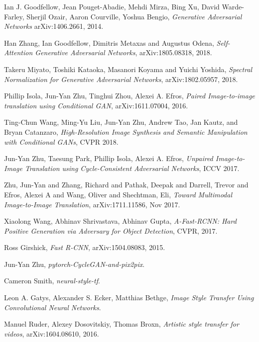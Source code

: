 \begin{thebibliography}{}

    Ian J. Goodfellow, Jean Pouget-Abadie, Mehdi Mirza, Bing Xu, David Warde-Farley, Sherjil Ozair, Aaron Courville, Yoshua Bengio,
    \emph{Generative Adversarial Networks}
    arXiv:1406.2661, 2014.

	Han Zhang, Ian Goodfellow, Dimitris Metaxas and Augustus Odena,
	\emph{Self-Attention Generative Adversarial Networks},
	arXiv:1805.08318, 2018.

	Takeru Miyato, Toshiki Kataoka, Masanori Koyama and Yuichi Yoshida,
	\emph{Spectral Normalization for Generative Adversarial Networks},
	arXiv:1802.05957, 2018.

	Phillip Isola, Jun-Yan Zhu, Tinghui Zhou, Alexei A. Efros,
	\emph{Paired Image-to-image translation using Conditional GAN},
	arXiv:1611.07004, 2016.

	Ting-Chun Wang, Ming-Yu Liu, Jun-Yan Zhu, Andrew Tao, Jan Kautz, and Bryan Catanzaro,
	\emph{High-Resolution Image Synthesis and Semantic Manipulation with Conditional GANs},
	CVPR 2018.

	Jun-Yan Zhu, Taesung Park, Phillip Isola, Alexei A. Efros,
	\emph{Unpaired Image-to-Image Translation using Cycle-Consistent Adversarial Networks},
	ICCV 2017.

	Zhu, Jun-Yan and Zhang, Richard and Pathak, Deepak and Darrell, Trevor and Efros, Alexei A and Wang, Oliver and Shechtman, Eli,
	\emph{Toward Multimodal Image-to-Image Translation},
	arXiv:1711.11586, Nov 2017.

	Xiaolong Wang, Abhinav Shrivastava, Abhinav Gupta,
	\emph{A-Fast-RCNN: Hard Positive Generation via Adversary for Object Detection},
    CVPR, 2017.

	Ross Girshick,
    \emph{Fast R-CNN},
    arXiv:1504.08083, 2015.

	Jun-Yan Zhu,
	\emph{pytorch-CycleGAN-and-pix2pix}.

	Cameron Smith,
	\emph{neural-style-tf}.

	Leon A. Gatys, Alexander S. Ecker, Matthias Bethge,
    \emph{Image Style Transfer Using Convolutional Neural Networks}.

	Manuel Ruder, Alexey Dosovitskiy, Thomas Broxn,
    \emph{Artistic style transfer for videos},
    arXiv:1604.08610, 2016.


\end{thebibliography}
